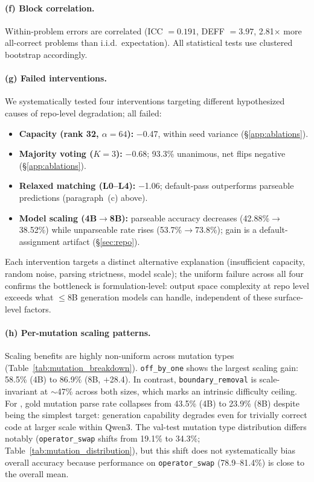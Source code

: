 \paragraph{(f) Block correlation.}
Within-problem errors are correlated (ICC $= 0.191$, DEFF $= 3.97$, 2.81$\times$ more all-correct problems than i.i.d.\ expectation). All statistical tests use clustered bootstrap accordingly.

\paragraph{(g) Failed interventions.}
We systematically tested four interventions targeting different hypothesized causes of \cwm{} repo-level degradation; all failed:

\begin{itemize}[leftmargin=*,itemsep=1pt,topsep=2pt]
\item \textbf{Capacity (rank 32, $\alpha{=}64$):} $-$0.47\pp{}, within seed variance (\S\ref{app:ablations}).
\item \textbf{Majority voting ($K{=}3$):} $-$0.68\pp{}; 93.3\% unanimous, net flips negative (\S\ref{app:ablations}).
\item \textbf{Relaxed matching (L0--L4):} $-$1.06\pp{}; default-pass outperforms parseable predictions (paragraph~(c) above).
\item \textbf{Model scaling (4B$\to$8B):} parseable accuracy decreases (42.88\%$\to$38.52\%) while unparseable rate rises (53.7\%$\to$73.8\%); gain is a default-assignment artifact (\S\ref{sec:repo}).
\end{itemize}

\noindent Each intervention targets a distinct alternative explanation (insufficient capacity, random noise, parsing strictness, model scale); the uniform failure across all four confirms the bottleneck is formulation-level: output space complexity at repo level exceeds what ${\leq}$8B generation models can handle, independent of these surface-level factors.

\paragraph{(h) Per-mutation scaling patterns.}
Scaling benefits are highly non-uniform across mutation types (Table~\ref{tab:mutation_breakdown}). \texttt{off\_by\_one} shows the largest \cls{} scaling gain: 58.5\% (4B) to 86.9\% (8B, $+$28.4\pp{}). In contrast, \texttt{boundary\_removal} is scale-invariant at ${\sim}$47\% across both sizes, which marks an intrinsic difficulty ceiling. For \cwm{}, gold mutation parse rate collapses from 43.5\% (4B) to 23.9\% (8B) despite being the simplest target: generation capability degrades even for trivially correct code at larger scale within Qwen3. The val-test mutation type distribution differs notably (\texttt{operator\_swap} shifts from 19.1\% to 34.3\%; Table~\ref{tab:mutation_distribution}), but this shift does not systematically bias overall accuracy because \cls{} performance on \texttt{operator\_swap} (78.9--81.4\%) is close to the overall mean.


